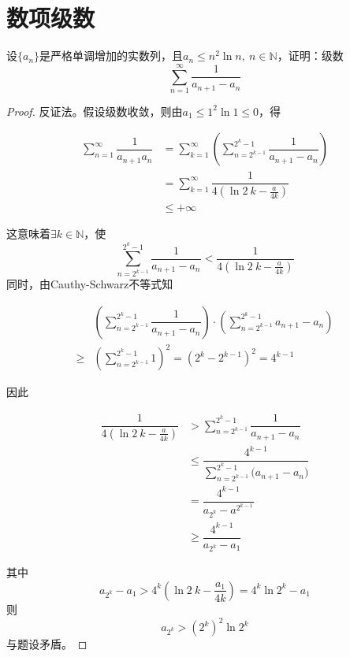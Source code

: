 \section{数项级数}

\begin{proposition}

    设$\{a_n\}$是严格单调增加的实数列，且$a_n \leq n^2 \ln n,\ n\in\mathbb{N}$，证明：级数
    $$ \sum\limits_{n=1}^{\infty}{\dfrac{1}{a_{n+1} - a_n}}$$

\end{proposition}

\begin{proof}

    反证法。假设级数收敛，则由$a_1 \leq 1^2 \ln1 \leq 0$，得
    
    \begin{align*}
        \sum\limits_{n=1}^{\infty}{\dfrac{1}{a_{n+1}a_n}} &= \sum\limits_{k=1}^{\infty}{\left(\sum\limits_{n=2^{k-1}}^{2^k - 1}{\dfrac{1}{a_{n+1}-a_n}}\right)}\\
        &= \sum\limits_{k=1}^{\infty}{\dfrac{1}{4(\ln{2}\ k-\frac{a}{4k})}}\\
        &\leq +\infty
    \end{align*}

    这意味着$\exists k \in \mathbb{N}$，使
    $$ \sum\limits_{n=2^{k-1}}^{2^k - 1}{\dfrac{1}{a_{n+1}-a_n}} < \dfrac{1}{4(\ln{2}\ k-\frac{a}{4k})}$$
    同时，由\textup{Cauthy-Schwarz}不等式知

    \begin{align*}
        & \left( \sum\limits_{n=2^{k-1}}^{2^k - 1}{\dfrac{1}{a_{n+1}-a_n}} \right) \cdot \left( \sum\limits_{n=2^{k-1}}^{2^k - 1}{a_{n+1}-a_n} \right) \\
        \geq & \left( \sum\limits_{n=2^{k-1}}^{2^k - 1}{1} \right)^2 = (2^k - 2^{k-1})^2 =  4^{k-1}
    \end{align*}

    因此

    \begin{align*}
        \dfrac{1}{4(\ln{2}\ k-\frac{a}{4k})} &> \sum\limits_{n=2^{k-1}}^{2^k - 1}{\dfrac{1}{a_{n+1}-a_n}}\\
        & \leq \dfrac{4^{k-1}}{\sum\limits_{n=2^{k-1}}^{2^k - 1}{(a_{n+1}-a_n})}\\
        & = \dfrac{4^{k-1}}{a_{2^k} - a^{2^{k-1}}}\\
        & \geq \dfrac{4^{k-1}}{a_{2^k} - a_1}
    \end{align*}

    其中
    $$a_{2^k} - a_1 > 4^k\left(\ln{2}\ k - \dfrac{a_1}{4k}\right) = 4^k \ln{2^k} - a_1$$
    则
    $$a_{2^k} > (2^k)^2 \ln{2^k}$$
    与题设矛盾。

\end{proof}

